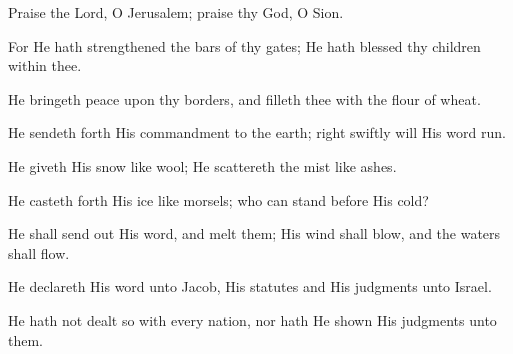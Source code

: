 Praise the Lord, O Jerusalem; praise thy God, O Sion.

For He hath strengthened the bars of thy gates; He hath blessed thy children within thee.

He bringeth peace upon thy borders, and filleth thee with the flour of wheat.

He sendeth forth His commandment to the earth; right swiftly will His word run.

He giveth His snow like wool; He scattereth the mist like ashes.

He casteth forth His ice like morsels; who can stand before His cold?

He shall send out His word, and melt them; His wind shall blow, and the waters shall flow.

He declareth His word unto Jacob, His statutes and His judgments unto Israel.

He hath not dealt so with every nation, nor hath He shown His judgments unto them.
